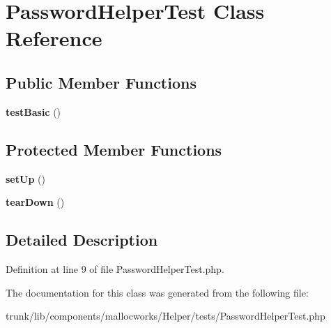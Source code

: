 \hypertarget{class_password_helper_test}{
\section{PasswordHelperTest Class Reference}
\label{class_password_helper_test}
}
\subsection*{Public Member Functions}
\begin{DoxyCompactItemize}
\item 
\hypertarget{class_password_helper_test_a43130cb481135ee931f1562a1503378a}{
{\bfseries testBasic} ()}
\label{class_password_helper_test_a43130cb481135ee931f1562a1503378a}

\end{DoxyCompactItemize}
\subsection*{Protected Member Functions}
\begin{DoxyCompactItemize}
\item 
\hypertarget{class_password_helper_test_a0bc688732d2b3b162ffebaf7812e78da}{
{\bfseries setUp} ()}
\label{class_password_helper_test_a0bc688732d2b3b162ffebaf7812e78da}

\item 
\hypertarget{class_password_helper_test_a80fe3d17e658907fc75346a0ec9d6fc7}{
{\bfseries tearDown} ()}
\label{class_password_helper_test_a80fe3d17e658907fc75346a0ec9d6fc7}

\end{DoxyCompactItemize}


\subsection{Detailed Description}


Definition at line 9 of file PasswordHelperTest.php.



The documentation for this class was generated from the following file:\begin{DoxyCompactItemize}
\item 
trunk/lib/components/mallocworks/Helper/tests/PasswordHelperTest.php\end{DoxyCompactItemize}
